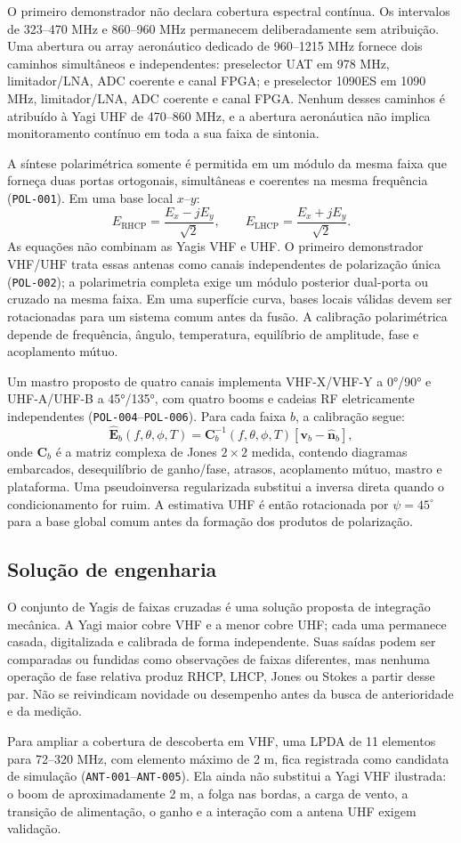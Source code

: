 O primeiro demonstrador não declara cobertura espectral contínua. Os intervalos de 323--470 MHz e 860--960 MHz permanecem deliberadamente sem atribuição. Uma abertura ou array aeronáutico dedicado de 960--1215 MHz fornece dois caminhos simultâneos e independentes: preselector UAT em 978 MHz, limitador/LNA, ADC coerente e canal FPGA; e preselector 1090ES em 1090 MHz, limitador/LNA, ADC coerente e canal FPGA. Nenhum desses caminhos é atribuído à Yagi UHF de 470--860 MHz, e a abertura aeronáutica não implica monitoramento contínuo em toda a sua faixa de sintonia.

A síntese polarimétrica somente é permitida em um módulo da mesma faixa que forneça duas portas ortogonais, simultâneas e coerentes na mesma frequência (\texttt{POL-001}). Em uma base local $x$--$y$:
\[
E_{\mathrm{RHCP}}=\frac{E_x-jE_y}{\sqrt{2}},\qquad E_{\mathrm{LHCP}}=\frac{E_x+jE_y}{\sqrt{2}}.
\]
As equações não combinam as Yagis VHF e UHF. O primeiro demonstrador VHF/UHF trata essas antenas como canais independentes de polarização única (\texttt{POL-002}); a polarimetria completa exige um módulo posterior dual-porta ou cruzado na mesma faixa. Em uma superfície curva, bases locais válidas devem ser rotacionadas para um sistema comum antes da fusão. A calibração polarimétrica depende de frequência, ângulo, temperatura, equilíbrio de amplitude, fase e acoplamento mútuo.

Um mastro proposto de quatro canais implementa VHF-X/VHF-Y a 0°/90° e UHF-A/UHF-B a 45°/135°, com quatro booms e cadeias RF eletricamente independentes (\texttt{POL-004}--\texttt{POL-006}). Para cada faixa $b$, a calibração segue:
\[
\widehat{\mathbf{E}}_b(f,\theta,\phi,T)=
\mathbf{C}_b^{-1}(f,\theta,\phi,T)
\left[\mathbf{v}_b-\widehat{\mathbf{n}}_b\right],
\]
onde $\mathbf{C}_b$ é a matriz complexa de Jones $2\times2$ medida, contendo diagramas embarcados, desequilíbrio de ganho/fase, atrasos, acoplamento mútuo, mastro e plataforma. Uma pseudoinversa regularizada substitui a inversa direta quando o condicionamento for ruim. A estimativa UHF é então rotacionada por $\psi=45^\circ$ para a base global comum antes da formação dos produtos de polarização.

\subsection*{Solução de engenharia}
O conjunto de Yagis de faixas cruzadas é uma solução proposta de integração mecânica. A Yagi maior cobre VHF e a menor cobre UHF; cada uma permanece casada, digitalizada e calibrada de forma independente. Suas saídas podem ser comparadas ou fundidas como observações de faixas diferentes, mas nenhuma operação de fase relativa produz RHCP, LHCP, Jones ou Stokes a partir desse par. Não se reivindicam novidade ou desempenho antes da busca de anterioridade e da medição.

Para ampliar a cobertura de descoberta em VHF, uma LPDA de 11 elementos para 72--320 MHz, com elemento máximo de 2 m, fica registrada como candidata de simulação (\texttt{ANT-001}--\texttt{ANT-005}). Ela ainda não substitui a Yagi VHF ilustrada: o boom de aproximadamente 2 m, a folga nas bordas, a carga de vento, a transição de alimentação, o ganho e a interação com a antena UHF exigem validação.
